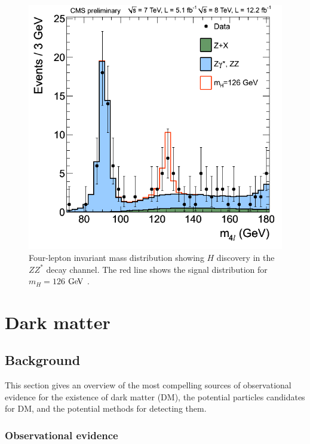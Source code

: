 \begin{figure}[tbh]
\centering
\includegraphics[width=5.5in]{figures/ZZMass_7Plus8TeV_70-180_3GeV.png}
\caption{Four-lepton invariant mass distribution showing $H$ discovery in the $ZZ^*$ decay channel. The red line shows the signal distribution for $m_H=126$ $\mathrm{Ge\kern -0.1em V}$ \cite{CMS:HZZ}.}
\label{4l}
\end{figure}


\section{Dark matter}

\subsection{Background}

This section gives an overview of the most compelling sources of observational evidence for the existence of dark matter (DM), the potential particles candidates for DM, and the potential methods for detecting them.  

\subsubsection{Observational evidence}

